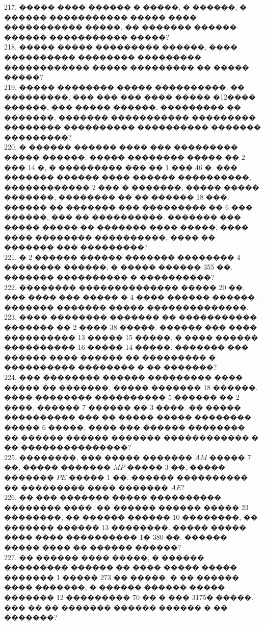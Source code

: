 \documentclass[12pt]{article}
\begin{document}
217. ����� ���� ������ � �����, � ������, � ������ ����������� ����� ���� ����������� �����. �� ������� ������ ������ ����������� �����?\\
218. ����� ����� ��������� ������, ���� ���������� �������� ��������� ������������ ����� ��������� �� ����� �����?\\
219. ����� �������� ����� ����������, �� ���������, ��� ��� ��� ���� ����� �12���� ������, ��� ����� ������. ��������� �� �������, ������� ����������� ��������� �������� ���������� ���������� ������� ���������?\\
220. � ������ ������ ���� ��� ��������� ����� ������. ����� �������� ����� �� 2 ��� 14 �, � ��������� ��� �� 1 ��� 46 �. ��� ������� ������ ���� ������ ����������, ������������ 2 ��� � �������, ����� ����� �������, �������� �� �� ������ 18 ���. ������ �� ������� ��� ��������� �� 6 ��� ������, ��� �� ����������. ������� ��� ����� ����� �� ������� ���� �����, ���� ���� �������� ����������, ���� �� ������� ��� ���������?\\
221. � 2 ������ ������ ������� �������� 4 �������� ������, � ����� ������ 355 ��. ������� ���������� � ����������?\\
222. �������� �������������� ����� 20 ��, ��� ���� ��� ����� � 4 ���� ������ ������. ������� ������� ����� ��������������.\\
223. ���� �������� ������� �� ����������� ������� �� 2 ���� 38 �����. ������ ��� ���� ���������� 13 ����� 15 �����, � ���� ������ ���������� 16 ����� 14 �����. ������� ��� ������ ���� ������ �� ��������� � ���������� �������� � �� �������?\\
224. ��� �������� ������ ��������� ���� ����� �� �������, ����� ������� 18 ������. ���� �������� ���������� 5 ������ �� 2 ����, ������ 7 ������ �� 3 ����. �� ����� ���������� ��� �� ����� ����� �������� ����� 6 �����, ���� ��� ������ �������� �� ������ ������ ������� ������������ � �� ���������������?\\
225. ��������, ��� ����� ������� $AM$ ����� 7 ��, ����� ������� $MP$ ����� 3 ��, ����� ������� $PE$ ����� 1 ��. ������ ���������� �� ��������� ���� ������� $AE?$\\
226. �� ��� ������� ����� ���������� �������� ����. �� ������ ������ ����� 23 ��������, �� ������ ������ 10 ��������, �� ������� ������ 13 ��������. ����� ����� ���� ���� ���������� 1� 380 ��. ������ ����� ���� �� ������ ������?\\
227. �� ������ ���� �����, � ������ ��������� ������ �� ���� ����� ����� ������� 1 ����� 273 �� �����, � �� ������ ���� �������, � ������ ������ ����� ������� 12 ��������� 70 �� � ��� 3175� �����. ��� �� �� ������� ������ ������ � �� �������?\\
\end{document}
